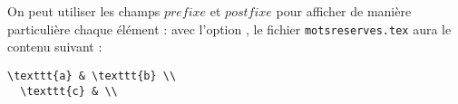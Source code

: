On peut utiliser les champs $prefixe$ et $postfixe$ pour afficher de manière particulière chaque élément : avec l'option , le fichier \texttt{motsreserves.tex} aura le contenu suivant :
\begin{lstlisting}[backgroundcolor=\color{yellow!10}, frame=tlbr, basicstyle=\small\tt]
  \texttt{a} & \texttt{b} \\
  \texttt{c} & \\
\end{lstlisting}


